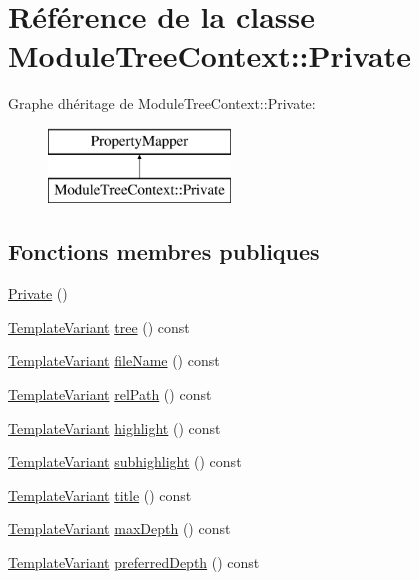 \hypertarget{class_module_tree_context_1_1_private}{}\section{Référence de la classe Module\+Tree\+Context\+:\+:Private}
\label{class_module_tree_context_1_1_private}
Graphe d\textquotesingle{}héritage de Module\+Tree\+Context\+:\+:Private\+:\begin{figure}[H]
\begin{center}
\leavevmode
\includegraphics[height=2.000000cm]{class_module_tree_context_1_1_private}
\end{center}
\end{figure}
\subsection*{Fonctions membres publiques}
\begin{DoxyCompactItemize}
\item 
\hyperlink{class_module_tree_context_1_1_private_acdcb6c3788dd51e8b29d5c7e6d4657e2}{Private} ()
\item 
\hyperlink{class_template_variant}{Template\+Variant} \hyperlink{class_module_tree_context_1_1_private_a397639fb2cca0fc2ebce7027b0dba3b4}{tree} () const 
\item 
\hyperlink{class_template_variant}{Template\+Variant} \hyperlink{class_module_tree_context_1_1_private_ad8071bef24c29158b5b87d073a091a11}{file\+Name} () const 
\item 
\hyperlink{class_template_variant}{Template\+Variant} \hyperlink{class_module_tree_context_1_1_private_ad453b94b2b326f26da85241fa2dd6986}{rel\+Path} () const 
\item 
\hyperlink{class_template_variant}{Template\+Variant} \hyperlink{class_module_tree_context_1_1_private_a257f1b5f83c279a7de40beca23af5e07}{highlight} () const 
\item 
\hyperlink{class_template_variant}{Template\+Variant} \hyperlink{class_module_tree_context_1_1_private_ad51b2c94874fbb26adec50f615f47db2}{subhighlight} () const 
\item 
\hyperlink{class_template_variant}{Template\+Variant} \hyperlink{class_module_tree_context_1_1_private_a04d2735c2097692613ee97d3114a49e5}{title} () const 
\item 
\hyperlink{class_template_variant}{Template\+Variant} \hyperlink{class_module_tree_context_1_1_private_a61317dc88c6385374c4d7869b80160f2}{max\+Depth} () const 
\item 
\hyperlink{class_template_variant}{Template\+Variant} \hyperlink{class_module_tree_context_1_1_private_aae71d26f8b6f54a9170c057dba0d6a5f}{preferred\+Depth} () const 
\end{DoxyCompactItemize}


